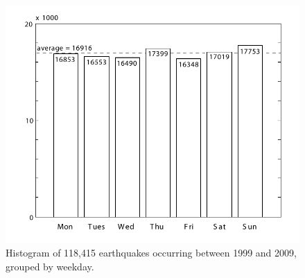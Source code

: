 \documentclass{article}
\begin{document}
\begin{figure}[h]
  \centering
\includegraphics[width=\textwidth]{histogram-1999-2009.pdf}  
  \caption{Histogram of 118,415 earthquakes occurring between 1999
    and 2009, grouped by weekday.}
  \label{fig:1}
\end{figure}
\end{document}
